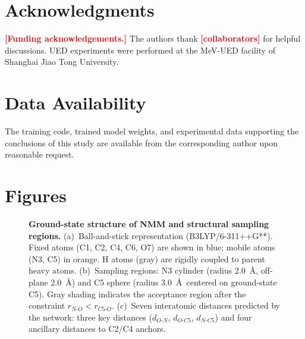 \documentclass[12pt]{article}
\newcommand{\TBD}[1]{\textcolor{red}{\textbf{[#1]}}}
\begin{document}
\section*{Acknowledgments}

\TBD{Funding acknowledgements.}
The authors thank \TBD{collaborators} for helpful discussions.
UED experiments were performed at the MeV-UED facility of Shanghai
Jiao Tong University.

\section*{Data Availability}

The training code, trained model weights, and experimental data
supporting the conclusions of this study are available from the
corresponding author upon reasonable request.

\clearpage



\makeatletter
\renewcommand{\fnum@figure}{\textbf{Fig.\ \thefigure}}
\renewcommand{\fnum@table}{\textbf{Table\ \thetable}}
\makeatother

\clearpage
\section*{Figures}

\begin{figure}[h]
  \centering
  \caption{
    \textbf{Ground-state structure of NMM and structural sampling regions.}
    (a)~Ball-and-stick representation (B3LYP/6-311++G**). Fixed atoms
    (C1, C2, C4, C6, O7) are shown in blue; mobile atoms (N3, C5) in
    orange. H atoms (gray) are rigidly coupled to parent heavy atoms.
    (b)~Sampling regions: N3 cylinder (radius 2.0~\AA, off-plane
    2.0~\AA) and C5 sphere (radius 3.0~\AA\ centered on ground-state
    C5). Gray shading indicates the acceptance region after the
    constraint $r_{N\text{-}O} < r_{C5\text{-}O}$.
    (c)~Seven interatomic distances predicted by the network:
    three key distances ($d_{O\text{-}N}$, $d_{O\text{-}C5}$,
    $d_{N\text{-}C5}$) and four ancillary distances to C2/C4 anchors.
  }
  \label{fig:structure}
\end{figure}
\end{document}
